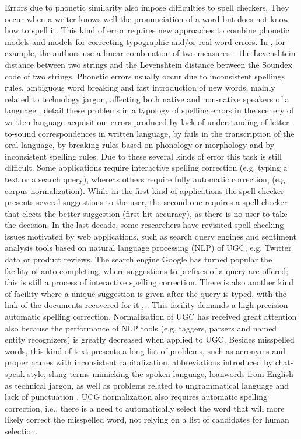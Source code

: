 Errors due to phonetic similarity also impose difficulties to spell checkers. They occur when a writer knows well the pronunciation of a word but does not know how to spell it. This kind of error requires new approaches to combine phonetic models and models for correcting typographic and/or real-word errors. In \cite{Zampieri2014}, for example, the authors use a linear combination of two measures -- the Levenshtein distance between
two strings and the Levenshtein distance between the Soundex \cite{soundex} code of two strings.
Phonetic errors usually occur due to inconsistent spellings rules, ambiguous word breaking and fast introduction of new words, mainly related to technology jargon, affecting both native and non-native speakers of a language \cite{Duan2011}. 
\cite{Baptista2011} detail these problems in a typology of spelling errors in the scenery of written language acquisition: errors produced by lack of understanding of  letter-to-sound correspondences in written language, by fails in the transcription of the oral language, by breaking rules based on phonology or morphology and by inconsistent spelling rules. Due to these several kinds of error this task is still difficult.
Some applications require interactive spelling correction (e.g. typing a text or a search query),  whereas others require fully automatic correction, (e.g. corpus normalization). While in the first kind of applications the spell checker presents several suggestions to the user, the second one requires a spell checker that elects the better suggestion (first hit accuracy), as there is no user to take the decision.
In the last decade, some researchers have revisited spell checking issues motivated by web applications, such as search query engines and sentiment analysis tools based on natural language processing (NLP) of UGC, e.g. Twitter data or product reviews.
The search engine Google has turned popular the facility of auto-completing, where suggestions to prefixes of a query are offered; this is still a process of interactive spelling correction. There is also another kind of facility where a unique suggestion is given after the query is typed, with the link of the documents recovered for it \cite{Duan2011}, \cite{Cucerzan2004}. This facility demands a high precision automatic spelling correction. 
Normalization of UGC has received great attention also because the performance of NLP tools (e.g. taggers, parsers and named entity recognizers) is greatly decreased when applied to UGC. Besides misspelled words, this kind of text presents a long list of problems, such as acronyms and proper names with inconsistent capitalization, abbreviations introduced by chat-speak style, slang terms mimicking the spoken language, loanwords from English as technical jargon, as well as problems related to ungrammatical language and lack of punctuation \cite{Duran2014,DeClercq2013,Han2013,Andrade2012}.
UCG normalization also requires automatic spelling correction, i.e., there is a need to automatically select the word that will more likely correct the misspelled word, not relying on a list of candidates for human selection. 


